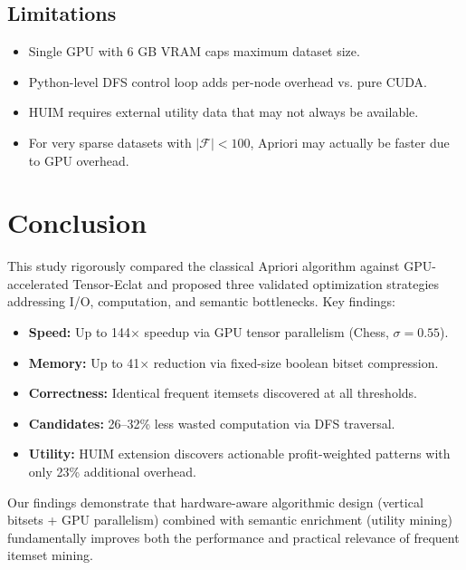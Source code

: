 \documentclass[conference]{IEEEtran}
\begin{document}
\subsection{Limitations}
\begin{itemize}
    \item Single GPU with 6 GB VRAM caps maximum dataset size.
    \item Python-level DFS control loop adds per-node overhead vs. pure CUDA.
    \item HUIM requires external utility data that may not always be available.
    \item For very sparse datasets with $|\mathcal{F}| < 100$, Apriori may actually be faster due to GPU overhead.
\end{itemize}

\section{Conclusion}

This study rigorously compared the classical Apriori algorithm against GPU-accelerated Tensor-Eclat and proposed three validated optimization strategies addressing I/O, computation, and semantic bottlenecks. Key findings:

\begin{itemize}
    \item \textbf{Speed:} Up to 144$\times$ speedup via GPU tensor parallelism (Chess, $\sigma=0.55$).
    \item \textbf{Memory:} Up to 41$\times$ reduction via fixed-size boolean bitset compression.
    \item \textbf{Correctness:} Identical frequent itemsets discovered at all thresholds.
    \item \textbf{Candidates:} 26--32\% less wasted computation via DFS traversal.
    \item \textbf{Utility:} HUIM extension discovers actionable profit-weighted patterns with only 23\% additional overhead.
\end{itemize}

Our findings demonstrate that hardware-aware algorithmic design (vertical bitsets + GPU parallelism) combined with semantic enrichment (utility mining) fundamentally improves both the performance and practical relevance of frequent itemset mining.
\end{document}

